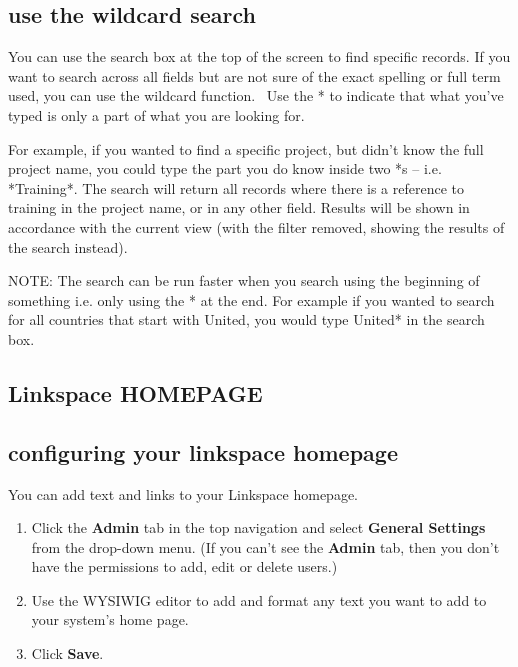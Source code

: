 \documentclass{ctrlo-int-toc}
\begin{document}
\subsection[use the wildcard search]{use the wildcard search}
You can use the search box at the top of the screen to find specific records. If you want to search across all fields but are not sure of the exact spelling or full term used, you can use the wildcard function. \ Use the * to indicate that what you've typed is only a part of what you are looking for.

For example, if you wanted to find a specific project, but didn't know the full project name, you could type the part you do know inside two *s -- i.e. *Training*. The search will return all records where there is a reference to training in the project name, or in any other field. Results will be shown in accordance with the current view (with the filter removed, showing the results of the search instead).

\begin{notebox}
NOTE: The search can be run faster when you search using the beginning of something i.e. only using the * at the end. For example if you wanted to search for all countries that start with United, you would type United* in the search box. 
\end{notebox}

\begin{admin}
\clearpage\section[Linkspace HOMEPAGE]{Linkspace HOMEPAGE}
\subsection[configuring your linkspace homepage]{configuring your linkspace homepage}
You can add text and links to your Linkspace homepage.

\begin{enumerate}
\item Click the \textbf{Admin} tab in the top navigation and select \textbf{General Settings} from the drop-down menu. (If you can't see the \textbf{Admin} tab, then you don't have the permissions to add, edit or delete users.)
\item Use the WYSIWIG editor to add and format any text you want to add to your system's home page.
\item Click \textbf{Save}.
\end{enumerate}
\end{admin}
\end{document}
